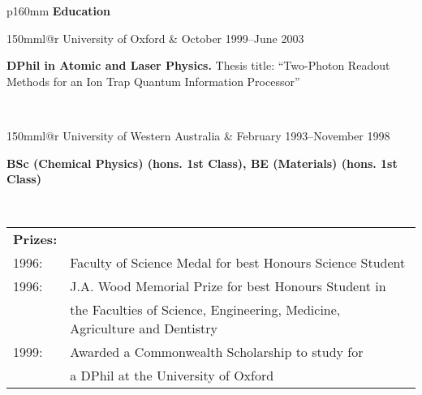 \documentclass[10pt,a4paper]{article}
\makeatletter
\newcommand{\role}[6]{
\begin{tabular*}{150mm}{l@{\extracolsep{\fill}}r}
#5 & #1--#2 \\ 
\multicolumn{2}{p{145mm}}
{\textbf{#3}#4

#6} 
\end{tabular*}
\vspace{2mm}
 }
\makeatother
\begin{document}
\vspace{0.1in}
\begin{tabular}{p{160mm}}
  {\large \textbf{Education}}\\
  \hline
  \role{October 1999}{June 2003} 
     {DPhil in Atomic and Laser Physics.}{ Thesis title: 
     ``Two-Photon Readout Methods for an Ion Trap Quantum Information
     Processor''}
     {University of Oxford}{} \\
  \role{February 1993}{November 1998}
      {BSc (Chemical Physics) (hons. 1st Class),
       BE (Materials) (hons. 1st Class)}{}
      {University of Western Australia}{}
    \\
    \begin{tabular*}{150mm}{ll}
      \textbf{Prizes:}\\
        1996: & Faculty of Science Medal for best Honours Science
        Student\\
        1996: & J.A. Wood Memorial Prize for best Honours Student in\\
        & the Faculties of Science, Engineering, Medicine, Agriculture
        and Dentistry\\
         1999: & Awarded a Commonwealth Scholarship to study for\\
         & a DPhil at the University of Oxford
    \end{tabular*}

\end{tabular} \\
%
\end{document}
